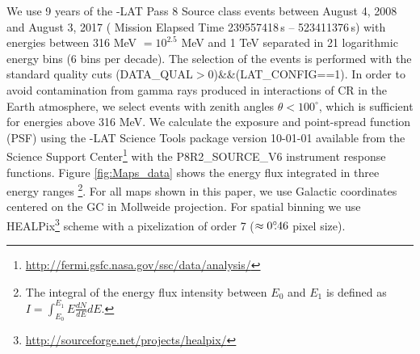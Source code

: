 We use 9 years of the \Fermi-LAT Pass 8 Source class events
between August 4, 2008  and August 3, 2017 ({\Fermi} Mission Elapsed Time 239557418\,s -- 523411376\,s)
with energies between 316 MeV $ = 10^{2.5}$ MeV
and 1 TeV separated in 21 logarithmic energy bins (6 bins per decade).
The selection of the events is performed with the standard quality cuts (DATA\_QUAL$>$0)\&\&(LAT\_CONFIG==1).
In order to avoid contamination from gamma rays produced in interactions of CR in the Earth atmosphere, 
we select events with zenith angles $\theta < 100^{\circ}$,
which is sufficient for energies above 316 MeV.
We calculate the exposure and point-spread function (PSF) using the {\Fermi}-LAT Science Tools package version 
10-01-01 available from the {\Fermi} Science Support Center\footnote{\url{http://fermi.gsfc.nasa.gov/ssc/data/analysis/}} 
with the P8R2\_SOURCE\_V6 instrument response functions.
Figure \ref{fig:Maps_data} shows the energy flux integrated in three energy ranges%
\footnote{The integral of the energy flux intensity between $E_0$ and $E_1$ is defined as
$I = \int_{E_0}^{E_1} E \frac{dN}{dE} dE.$}.
For all maps shown in this paper, we use Galactic coordinates centered on the GC in Mollweide projection. %
For spatial binning we use HEALPix\footnote{\url{http://sourceforge.net/projects/healpix/}} \citep{2005ApJ...622..759G} scheme with a pixelization of order 7  
($\approx 0^\circ\!\!.46$ pixel size). 

